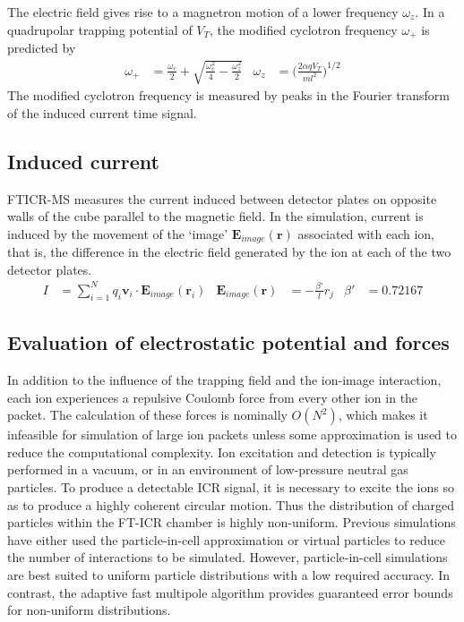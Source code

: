 \documentclass[10pt,conference,onecolumn]{IEEEtran}
\begin{document}
The electric field gives rise to a magnetron motion of a lower frequency $\omega_z$.
In a quadrupolar trapping potential of $V_T$, the modified cyclotron frequency $\omega_+$ is predicted by
\begin{align}
\omega_+ &= \frac{\omega_c}{2} + \sqrt{\frac{\omega_c^2}{4} - \frac{\omega_z^2}{2}} &
\omega_z &= \biggl(\frac{2 \alpha q V_T}{m l^2}\biggr)^{1/2}
\end{align}
The modified cyclotron frequency is measured by peaks in the Fourier transform of the induced current time signal.

\subsection{Induced current}

FTICR-MS measures the current induced between detector plates on opposite walls of the cube parallel to the magnetic field.
In the simulation, current is induced by the movement of the `image' $\mathbf{E}_{image}(\mathbf{r})$ associated with each ion, that is, the difference in the electric field generated by the ion at each of the two detector plates\cite{Guan1995}.
\begin{align}
I &= \sum_{i=1}^N q_i\mathbf{v}_i \cdot \mathbf{E}_{image}(\mathbf{r}_i) & \mathbf{E}_{image}(\mathbf{r}) &= - \frac{\beta'}{l} r_j & \beta' &= 0.72167
\end{align}

\subsection{Evaluation of electrostatic potential and forces}

In addition to the influence of the trapping field and the ion-image interaction, each ion experiences a repulsive Coulomb force from every other ion in the packet.
The calculation of these forces is nominally $O(N^2)$, which makes it infeasible for simulation of large ion packets unless some approximation is used to reduce the computational complexity.
Ion excitation and detection is typically performed in a vacuum, or in an environment of low-pressure neutral gas particles.
To produce a detectable ICR signal, it is necessary to excite the ions so as to produce a highly coherent circular motion.
Thus the distribution of charged particles within the FT-ICR chamber is highly non-uniform.
Previous simulations have either used the particle-in-cell approximation\cite{Leach2009} or virtual particles to reduce the number of interactions to be simulated\cite{Fujiwara2010}.
However, particle-in-cell simulations are best suited to uniform particle distributions with a low required accuracy\cite{Greengard1989}.
In contrast, the adaptive fast multipole algorithm\cite{Cheng1999} provides guaranteed error bounds for non-uniform distributions.
\end{document}
